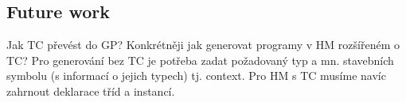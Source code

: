 \documentclass[11pt]{article}
\newcommand{\lterm}{$\lambda$-term\xspace}
\newcommand{\lterms}{$\lambda$-terms\xspace}
\newcommand{\red}[1]{{\color{red} #1}}
\begin{document}
\begin{article}


\section{Future work}







Jak TC převést do GP? Konkrétněji jak generovat programy v HM rozšířeném o TC?
Pro generování bez TC je potřeba zadat požadovaný typ a mn. stavebních symbolu (s informací o jejich typech) tj. context. Pro HM s TC musíme navíc zahrnout deklarace tříd a instancí.


\end{article}
\end{document}
